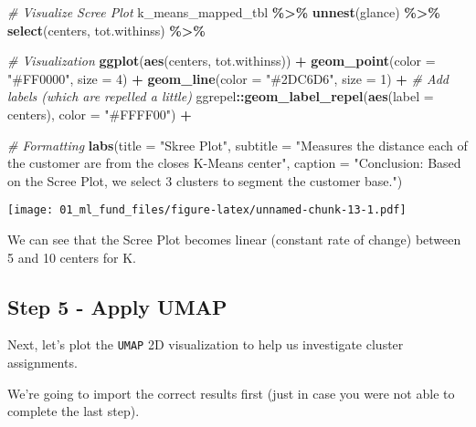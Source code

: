\documentclass[
]{article}
\newenvironment{Shaded}{\begin{snugshade}}{\end{snugshade}}
\newcommand{\AttributeTok}[1]{\textcolor[rgb]{0.13,0.29,0.53}{#1}}
\newcommand{\CommentTok}[1]{\textcolor[rgb]{0.56,0.35,0.01}{\textit{#1}}}
\newcommand{\DecValTok}[1]{\textcolor[rgb]{0.00,0.00,0.81}{#1}}
\newcommand{\FunctionTok}[1]{\textcolor[rgb]{0.13,0.29,0.53}{\textbf{#1}}}
\newcommand{\NormalTok}[1]{#1}
\newcommand{\SpecialCharTok}[1]{\textcolor[rgb]{0.81,0.36,0.00}{\textbf{#1}}}
\newcommand{\StringTok}[1]{\textcolor[rgb]{0.31,0.60,0.02}{#1}}
\begin{document}
\begin{Shaded}
\begin{Highlighting}[]
\CommentTok{\# Visualize Scree Plot}
\NormalTok{k\_means\_mapped\_tbl }\SpecialCharTok{\%\textgreater{}\%}
    \FunctionTok{unnest}\NormalTok{(glance) }\SpecialCharTok{\%\textgreater{}\%}
    \FunctionTok{select}\NormalTok{(centers, tot.withinss) }\SpecialCharTok{\%\textgreater{}\%}
    
    \CommentTok{\# Visualization}
    \FunctionTok{ggplot}\NormalTok{(}\FunctionTok{aes}\NormalTok{(centers, tot.withinss)) }\SpecialCharTok{+}
    \FunctionTok{geom\_point}\NormalTok{(}\AttributeTok{color =} \StringTok{"\#FF0000"}\NormalTok{, }\AttributeTok{size =} \DecValTok{4}\NormalTok{) }\SpecialCharTok{+}
    \FunctionTok{geom\_line}\NormalTok{(}\AttributeTok{color =} \StringTok{"\#2DC6D6"}\NormalTok{, }\AttributeTok{size =} \DecValTok{1}\NormalTok{) }\SpecialCharTok{+}
    \CommentTok{\# Add labels (which are repelled a little)}
\NormalTok{    ggrepel}\SpecialCharTok{::}\FunctionTok{geom\_label\_repel}\NormalTok{(}\FunctionTok{aes}\NormalTok{(}\AttributeTok{label =}\NormalTok{ centers), }\AttributeTok{color =} \StringTok{"\#FFFF00"}\NormalTok{) }\SpecialCharTok{+} 
    
    \CommentTok{\# Formatting}
    \FunctionTok{labs}\NormalTok{(}\AttributeTok{title =} \StringTok{"Skree Plot"}\NormalTok{,}
    \AttributeTok{subtitle =} \StringTok{"Measures the distance each of the customer are from the closes K{-}Means center"}\NormalTok{,}
    \AttributeTok{caption =} \StringTok{"Conclusion: Based on the Scree Plot, we select 3 clusters to segment the customer base."}\NormalTok{)}
\end{Highlighting}
\end{Shaded}

\texttt{[image: 01\_ml\_fund\_files/figure-latex/unnamed-chunk-13-1.pdf]}

We can see that the Scree Plot becomes linear (constant rate of change)
between 5 and 10 centers for K.

\hypertarget{step-5---apply-umap}{%
\subsection{Step 5 - Apply UMAP}\label{step-5---apply-umap}}

Next, let's plot the \texttt{UMAP} 2D visualization to help us
investigate cluster assignments.

We're going to import the correct results first (just in case you were
not able to complete the last step).
\end{document}
